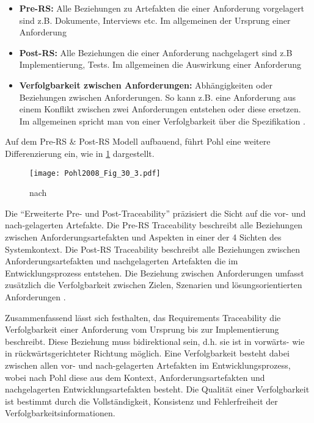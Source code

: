 \begin{itemize}
    \item \textbf{Pre-RS:} Alle Beziehungen zu Artefakten die einer Anforderung vorgelagert sind z.B. Dokumente, Interviews etc. Im allgemeinen der Ursprung einer Anforderung
    \item \textbf{Post-RS:} Alle Beziehungen die einer Anforderung nachgelagert sind z.B Implementierung, Tests. Im allgemeinen die Auswirkung einer Anforderung
    \item \textbf{Verfolgbarkeit zwischen Anforderungen:} Abhängigkeiten oder Beziehungen zwischen Anforderungen. So kann z.B. eine Anforderung aus einem Konflikt zwischen zwei Anforderungen entstehen oder diese ersetzen. Im allgemeinen spricht man von einer Verfolgbarkeit über die Spezifikation \cite{Pohl2015BasiswissenIREB-Standard}.
\end{itemize}

Auf dem Pre-RS \& Post-RS Modell aufbauend, führt Pohl eine weitere Differenzierung ein, wie in \ref{fig:abb2} dargestellt.

\begin{figure}[!htb]
  \centering
  \texttt{[image: Pohl2008\_Fig\_30\_3.pdf]}
  \caption{nach \cite[Fig. 30.3]{Pohl2008RequirementsTechniken}}
  \label{fig:abb2}
\end{figure}

Die \enquote{Erweiterte Pre- und Post-Traceability} präzisiert die Sicht auf die vor- und nach-gelagerten Artefakte. Die Pre-RS Traceability beschreibt alle Beziehungen zwischen Anforderungsartefakten und Aspekten in einer der 4 Sichten des Systemkontext. Die Post-RS Traceability beschreibt alle Beziehungen zwischen Anforderungsartefakten und nachgelagerten Artefakten die im Entwicklungsprozess entstehen. Die Beziehung zwischen Anforderungen umfasst zusätzlich die Verfolgbarkeit zwischen Zielen, Szenarien und lösungsorientierten Anforderungen \cite{Pohl2008RequirementsTechniken}.

Zusammenfassend lässt sich festhalten, das Requirements Traceability die Verfolgbarkeit einer Anforderung vom Ursprung bis zur Implementierung beschreibt. Diese Beziehung muss bidirektional sein, d.h. sie ist in vorwärts- wie in rückwärtsgerichteter Richtung möglich. Eine Verfolgbarkeit besteht dabei zwischen allen vor- und nach-gelagerten Artefakten im Entwicklungsprozess, wobei nach Pohl diese aus dem Kontext, Anforderungsartefakten und nachgelagerten Entwicklungsartefakten besteht. Die Qualität einer Verfolgbarkeit ist bestimmt durch die Vollständigkeit, Konsistenz und Fehlerfreiheit der Verfolgbarkeitsinformationen.

